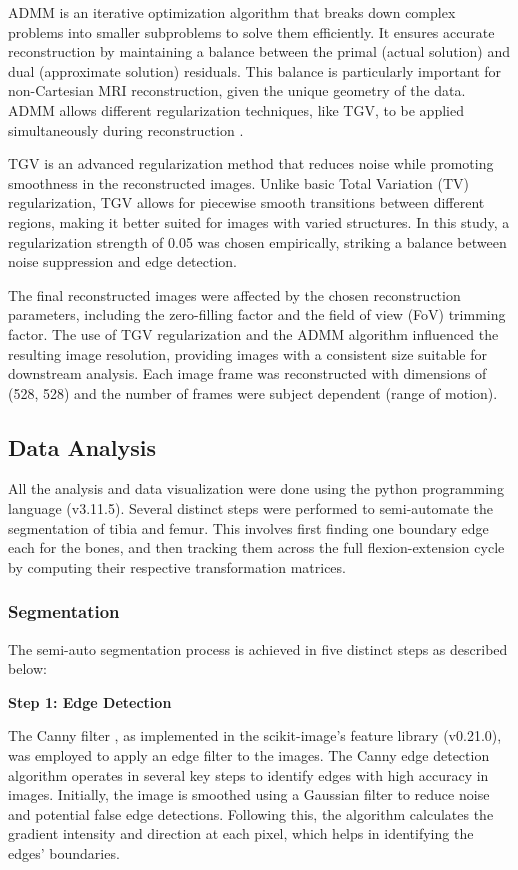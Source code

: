 \documentclass{micro-econ-thesis}
\begin{document}
ADMM is an iterative optimization algorithm that breaks down complex problems into smaller subproblems to solve them efficiently. It ensures accurate reconstruction by maintaining a balance between the primal (actual solution) and dual (approximate solution) residuals. This balance is particularly important for non-Cartesian MRI reconstruction, given the unique geometry of the data. ADMM allows different regularization techniques, like TGV, to be applied simultaneously during reconstruction \parencite{MAL-016}. 

TGV is an advanced regularization method that reduces noise while promoting smoothness in the reconstructed images. Unlike basic Total Variation (TV) regularization, TGV allows for piecewise smooth transitions between different regions, making it better suited for images with varied structures. In this study, a regularization strength of 0.05 was chosen empirically, striking a balance between noise suppression and edge detection.

The final reconstructed images were affected by the chosen reconstruction parameters, including the zero-filling factor and the field of view (FoV) trimming factor. The use of TGV regularization and the ADMM algorithm influenced the resulting image resolution, providing images with a consistent size suitable for downstream analysis. Each image frame was reconstructed with dimensions of (528, 528) and the number of frames were subject dependent (range of motion).


\subsection{Data Analysis}
All the analysis and data visualization were done using the python programming language (v3.11.5). Several distinct steps were performed to semi-automate the segmentation of tibia and femur. This involves first finding one boundary edge each for the bones, and then tracking them across the full flexion-extension cycle by computing their respective transformation matrices. 
 
\subsubsection{Segmentation}
The semi-auto segmentation process is achieved in five distinct steps as described below: 

\textbf{Step 1: Edge Detection}

The Canny filter \parencite{canny_computational_1986}, as implemented in the scikit-image's feature library (v0.21.0), was employed to apply an edge filter to the images. The Canny edge detection algorithm operates in several key steps to identify edges with high accuracy in images. Initially, the image is smoothed using a Gaussian filter to reduce noise and potential false edge detections. Following this, the algorithm calculates the gradient intensity and direction at each pixel, which helps in identifying the edges' boundaries.
\end{document}
